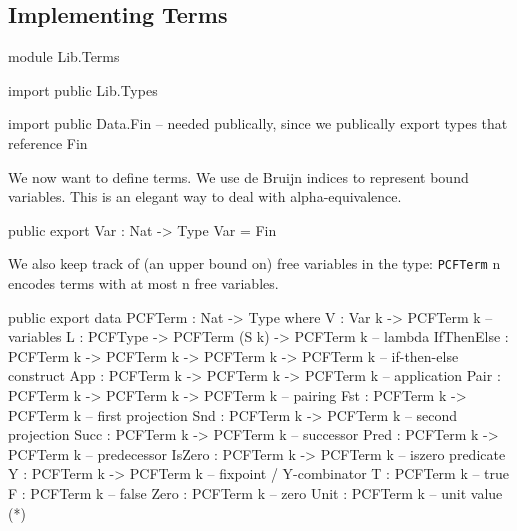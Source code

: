 \subsection{Implementing Terms}

\begin{hidden}
module Lib.Terms

import public Lib.Types

import public Data.Fin  -- needed publically, since we publically export types that reference Fin

\end{hidden}

We now want to define terms. We use de Bruijn indices to represent bound variables.
This is an elegant way to deal with alpha-equivalence.

\begin{code}
public export
Var : Nat -> Type
Var = Fin
\end{code}

We also keep track of (an upper bound on) free variables in the type:
\lstinline{PCFTerm} n encodes terms with at most n free variables.

\begin{code}
public export
data PCFTerm : Nat -> Type where
  V          : Var k -> PCFTerm k                                -- variables
  L          : PCFType -> PCFTerm (S k) -> PCFTerm k             -- lambda
  IfThenElse : PCFTerm k -> PCFTerm k -> PCFTerm k -> PCFTerm k  -- if-then-else construct
  App        : PCFTerm k -> PCFTerm k -> PCFTerm k               -- application
  Pair       : PCFTerm k -> PCFTerm k -> PCFTerm k               -- pairing
  Fst        : PCFTerm k -> PCFTerm k                            -- first projection
  Snd        : PCFTerm k -> PCFTerm k                            -- second projection
  Succ       : PCFTerm k -> PCFTerm k                            -- successor
  Pred       : PCFTerm k -> PCFTerm k                            -- predecessor
  IsZero     : PCFTerm k -> PCFTerm k                            -- iszero predicate
  Y          : PCFTerm k -> PCFTerm k                            -- fixpoint / Y-combinator
  T          : PCFTerm k                                         -- true
  F          : PCFTerm k                                         -- false
  Zero       : PCFTerm k                                         -- zero
  Unit       : PCFTerm k                                         -- unit value (*)
\end{code}

